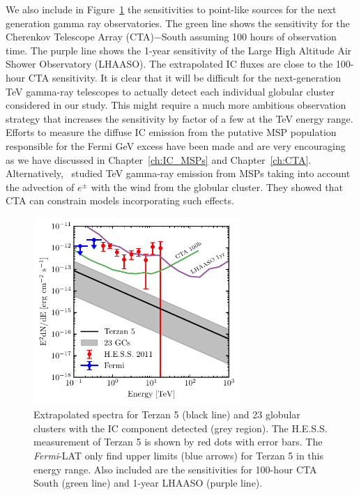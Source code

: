 \documentclass[doublespace,nopageskip]{VTthesis}
\begin{document}
We also include in Figure~\ref{fig:TeV} the sensitivities to point-like sources for the next generation gamma ray observatories. The green line shows the sensitivity for the Cherenkov Telescope Array (CTA)$-$South assuming 100 hours of observation time. The purple line shows the 1-year sensitivity of the Large High Altitude Air Shower Observatory (LHAASO). The extrapolated IC fluxes are close to the 100-hour CTA sensitivity. It is clear that it will be difficult for the next-generation TeV gamma-ray telescopes to actually detect each individual globular cluster considered in our study. This might require a much more ambitious observation strategy that increases the sensitivity by factor of a few at the TeV energy range.  Efforts to measure the diffuse IC emission from the putative MSP population responsible for the Fermi GeV excess have been made and are very encouraging as we have discussed in Chapter~\ref{ch:IC_MSPs} and Chapter~\ref{ch:CTA}. Alternatively,~\citet{2016MNRAS.458.1083B} studied TeV gamma-ray emission from MSPs taking into account the advection of $e^\pm$ with the wind from the globular cluster. They showed that CTA can constrain models incorporating such effects. 

\begin{figure}[htb]
    \centering
    \includegraphics[width=0.7\textwidth]{Figures/Globular/TeV.pdf}
    \caption{Extrapolated spectra for Terzan 5 (black line) and 23 globular clusters with the IC component detected (grey region). The H.E.S.S. measurement of Terzan 5 is shown by red dots with error bars. The {\it Fermi}-LAT only find upper limits (blue arrows) for Terzan 5 in this energy range. Also included are the sensitivities for 100-hour CTA South (green line) and 1-year LHAASO (purple line).}
    \label{fig:TeV}
\end{figure}
\end{document}
